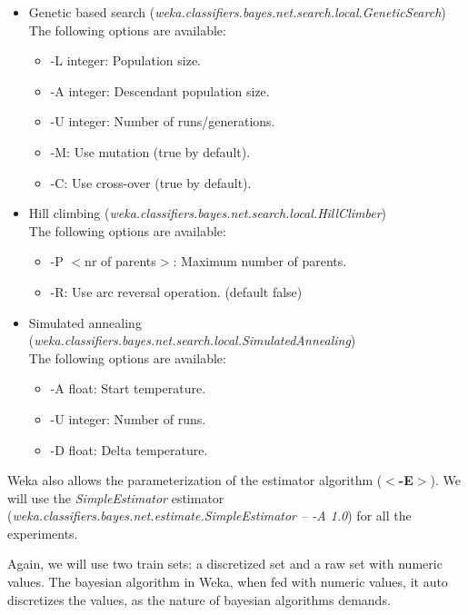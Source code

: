 \documentclass[a4paper]{llncs}
\begin{document}
\begin{itemize}
  \item Genetic based search (\textit{weka.classifiers.bayes.net.search.local.GeneticSearch}) \\
  The following options are available:
  \begin{itemize}
    \item -L integer: Population size. 
    \item -A integer: Descendant population size.
    \item -U integer: Number of runs/generations.
    \item -M: Use mutation (true by default).
    \item -C: Use cross-over (true by default).
  \end{itemize}
  
  \item Hill climbing (\textit{weka.classifiers.bayes.net.search.local.HillClimber}) \\
  The following options are available:
  \begin{itemize}
    \item -P $<$nr of parents$>$: Maximum number of parents.
    \item -R: Use arc reversal operation. (default false)
  \end{itemize}
  
  \item Simulated annealing (\textit{weka.classifiers.bayes.net.search.local.SimulatedAnnealing}) \\
  The following options are available:
  \begin{itemize}
    \item -A float: Start temperature.
    \item -U integer: Number of runs.
    \item -D float: Delta temperature.
  \end{itemize}
\end{itemize}

Weka also allows the parameterization of the estimator algorithm (\textbf{$<$-E$>$}).
We will use the \textit{SimpleEstimator} estimator (\textit{weka.classifiers.bayes.net.estimate.SimpleEstimator -- -A 1.0})
for all the experiments.

Again, we will use two train sets: a discretized set and a raw set with numeric values.
The bayesian algorithm in Weka, when fed with numeric values,
it auto discretizes the values, as the nature of bayesian algorithms demands.
\end{document}

